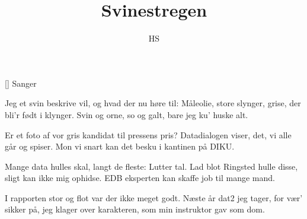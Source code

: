 \documentclass[a4paper,11pt]{article}
\title{Svinestregen}
\author{HS}
\begin{document}
\maketitle

\begin{roles}
[] Sanger
\end{roles}

\begin{song}
Jeg et svin beskrive vil,
og hvad der nu høre til:
Måleolie, store slynger,
grise, der bli'r født i klynger.
Svin og orne, so og galt,
bare jeg ku' huske alt.

Er et foto af vor gris
kandidat til pressens pris?
Datadialogen viser,
det, vi alle går og spiser.
Mon vi snart kan det besku
i kantinen på DIKU.

Mange data hulles skal,
langt de fleste: Lutter tal.
Lad blot Ringsted hulle disse,
sligt kan ikke mig ophidse.
EDB eksperten kan
skaffe job til mange mand.

I rapporten stor og flot
var der ikke meget godt.
Næste år dat2 jeg tager,
for vær' sikker på, jeg klager
over karakteren, som
min instruktor gav som dom.
\end{song}
\end{document}

